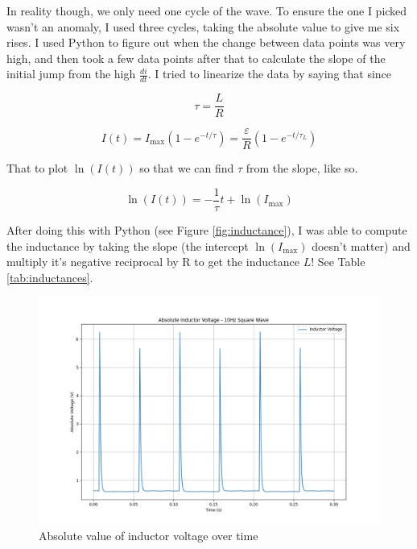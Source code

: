 \documentclass[12pt,letterpaper]{article}
\begin{document}
In reality though, we only need one cycle of the wave. To ensure the one I picked wasn't an anomaly, I used three cycles, taking the absolute value to give me six rises. I used Python to figure out when the change between data points was very high, and then took a few data points after that to calculate the slope of the initial jump from the high $\frac{di}{dt}$. I tried to linearize the data by saying that since 

\begin{equation}
    \tau=\frac{L}{R}
\end{equation}

\begin{equation}
    I(t)=I_{\text{max}} \left(1-e^{-t/\tau}\right)= \frac{\varepsilon}{R}\left(1-e^{-t/\tau_L}\right)
\label{eqn:current}
\end{equation}

That to plot $\ln(I(t))$ so that we can find $\tau$ from the slope, like so.

\begin{equation}
    \ln(I(t))=-\frac{1}{\tau}t+\ln(I_{\text{max}})
\end{equation}

After doing this with Python (see Figure \ref{fig:inductance}), I was able to compute the inductance by taking the slope (the intercept $\ln(I_{\text{max}})$ doesn't matter) and multiply it's negative reciprocal by R to get the inductance $L$! See Table \ref{tab:inductances}.

\begin{figure}[ht]
    \centering
    \includegraphics[width=5in]{images/abs_inductor_voltage_square.png}
    \caption{Absolute value of inductor voltage over time}
    \label{fig:square}
\end{figure}
\end{document}
